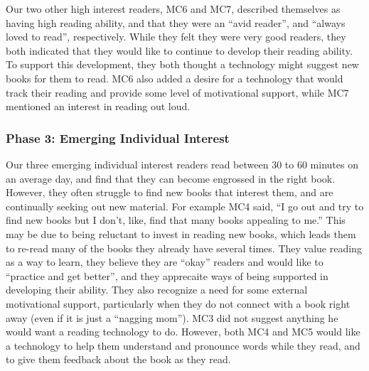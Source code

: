 \documentclass{sigchi}
\begin{document}
Our two other high interest readers, MC6 and MC7, described themselves as having high reading ability, and that they were an ``avid reader'', and ``always loved to read'', respectively. While they felt they were very good readers, they both indicated that they would like to continue to develop their reading ability. To support this development, they both thought a technology might suggest new books for them to read. MC6 also added a desire for a technology that would track their reading and provide some level of motivational support, while MC7 mentioned an interest in reading out loud.

\subsubsection{Phase 3: Emerging Individual Interest}
Our three emerging individual interest readers read between 30 to 60 minutes on an average day, and find that they can become engrossed in the right book. However, they often struggle to find new books that interest them, and are continually seeking out new material. For example MC4 said, ``I go out and try to find new books but I don't, like, find that many books appealing to me.'' This may be due to being reluctant to invest in reading new books, which leads them to re-read many of the books they already have several times. They value reading as a way to learn, they believe they are ``okay'' readers and would like to ``practice and get better'', and they apprecaite ways of being supported in developing their ability. They also recognize a need for some external motivational support, particularly when they do not connect with a book right away (even if it is just a ``nagging mom''). MC3 did not suggest anything he would want a reading technology to do. However, both MC4 and MC5 would like a technology to help them understand and pronounce words while they read, and to give them feedback about the book as they read.
\end{document}
